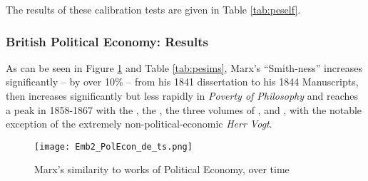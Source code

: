 The results of these calibration tests are given in Table \ref{tab:peself}.




\subsubsection{British Political Economy: Results}

As can be seen in Figure \ref{fig:pesims} and Table \ref{tab:pesims}, Marx's ``Smith-ness'' increases significantly -- by over 10\% -- from his 1841 dissertation to his 1844 Manuscripts, then increases significantly but less rapidly in \textit{Poverty of Philosophy} and reaches a peak in 1858-1867 with the \grundrisse{}, the \kritik{}, the three volumes of \mehrwert{}, and , with the notable exception of the extremely non-political-economic \textit{Herr Vogt}.



\begin{figure}
    \texttt{[image: Emb2\_PolEcon\_de\_ts.png]}
    \caption{Marx's similarity to works of Political Economy, over time}
    \label{fig:pesims}
\end{figure}
